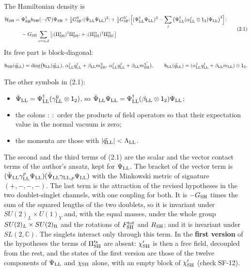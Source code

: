 \documentclass[
  10pt,
]{article}
\providecommand{\tightlist}{%
  \setlength{\itemsep}{0pt}\setlength{\parskip}{0pt}}
\begin{document}
The Hamiltonian density is
\[\begin{aligned}\mathcal H_{\rm SH}={}&\Psi^\dagger_{\rm SH}\mathsf h_{\rm SH}(-i\nabla)\Psi_{\rm SH}+\tfrac12G^{\rm S}_{\rm SF}{:}(\bar\Psi_{\rm LL}\Psi_{\rm LL})^2{:}
+\tfrac12G^{\rm V}_{\rm SF}{:}\Big[(\Psi^\dagger_{\rm LL}\Psi_{\rm LL})^2-\sum_j\big(\Psi^\dagger_{\rm LL}(\alpha^j_{\rm LL}\otimes\mathsf 1_2)\Psi_{\rm LL}\big)^2\Big]{:}\\
&-G_{\rm SH}\sum_{s={\rm u},{\rm d}}\big[{:}(\Pi^s_{\rm SH})^\dagger\Pi^s_{\rm SH}{:}+{:}(\Pi'^s_{\rm SH})^\dagger\Pi'^s_{\rm SH}{:}\big]\end{aligned}\tag{2.1}\]
Its free part is block-diagonal:
\[\mathsf h_{\rm SH}(\vec q_{\rm LL})=\mathrm{diag}\big(\mathsf h_{\rm LL}(\vec q_{\rm LL}),\,\alpha^j_{\rm LL}q^j_{\rm LL}+\beta_{\rm LL}m^\chi_{\rm SH},\,\alpha^j_{\rm LL}q^j_{\rm LL}+\beta_{\rm LL}m^{\chi'}_{\rm SH}\big),\qquad
\mathsf h_{\rm LL}(\vec q_{\rm LL})=(\alpha^j_{\rm LL}q^j_{\rm LL}+\beta_{\rm LL}m_{\rm LL})\otimes\mathsf 1_2.\]

The other symbols in (2.1):

\begin{itemize}
\tightlist
\item
  \(\bar\Psi_{\rm LL}=\Psi^\dagger_{\rm LL}(\gamma^0_{\rm LL}\otimes\mathsf 1_2)\),
  so
  \(\bar\Psi_{\rm LL}\Psi_{\rm LL}=\Psi^\dagger_{\rm LL}(\beta_{\rm LL}\otimes\mathsf 1_2)\Psi_{\rm LL}\);
\item
  the colons \({:}\ {:}\) order the products of field operators so that
  their expectation value in the normal vacuum is zero;
\item
  the momenta are those with
  \(\lvert\vec q_{\rm LL}\rvert<\Lambda_{\rm LL}\).
\end{itemize}

The second and the third terms of (2.1) are the scalar and the vector
contact terms of the author's ansatz, kept for \(\Psi_{\rm LL}\). The
bracket of the vector term is
\((\bar\Psi_{\rm LL}\gamma^p_{\rm LL}\Psi_{\rm LL})(\bar\Psi_{\rm LL}\gamma_{{\rm LL},p}\Psi_{\rm LL})\)
with the Minkowski metric of signature \((+,-,-,-)\). The last term is
the attraction of the revised hypotheses in the two doublet-singlet
channels, with one coupling for both. It is \(-G_{\rm SH}\) times the
sum of the squared lengths of the two doublets, so it is invariant under
\(SU(2)_L\times U(1)_Y\) and, with the equal masses, under the whole
group \(SU(2)_L\times SU(2)_{\rm R}\) and the rotations of
\(F^{\rm tot}_{\rm SH}\) and \(R_{\rm SH}\); and it is invariant under
\(SL(2,\mathbb C)\). The singlets interact only through this term. In
the \textbf{first version} of the hypotheses the terms of
\(\Pi'^s_{\rm SH}\) are absent: \(\chi'_{\rm SH}\) is then a free field,
decoupled from the rest, and the states of the first version are those
of the twelve components of \(\Psi_{\rm LL}\) and \(\chi_{\rm SH}\)
alone, with an empty block of \(\chi'_{\rm SH}\) (check SF-12).
\end{document}
